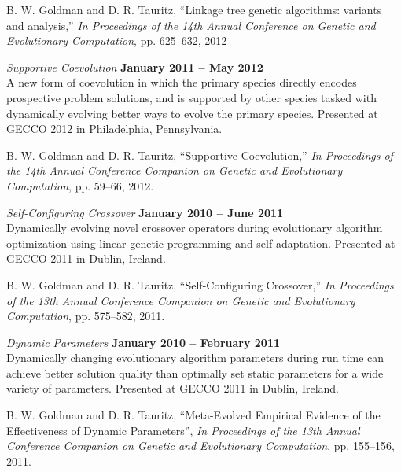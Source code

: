 \documentclass[margin,line]{resume}
\begin{document}
\begin{resume}
    \vspace{-2mm}
    B. W. Goldman and D. R. Tauritz,
    ``Linkage tree genetic algorithms: variants and analysis,''
    \textsl{In Proceedings of the 14th Annual Conference on Genetic and Evolutionary Computation}, pp. 625--632, 2012

    \textsl{Supportive Coevolution} \hfill \textbf{January 2011 -- May 2012}\\
    A new form of coevolution in which the primary species directly encodes prospective problem solutions,
    and is supported by other species tasked with dynamically evolving better ways to evolve the primary species.
    Presented at GECCO 2012 in Philadelphia, Pennsylvania.
    
    \vspace{-2mm}
    B. W. Goldman and D. R. Tauritz,
    ``Supportive Coevolution,''
    \textsl{In Proceedings of the 14th Annual Conference Companion on Genetic and Evolutionary Computation}, pp. 59--66, 2012.

    \pagebreak
    
    \textsl{Self-Configuring Crossover} \hfill \textbf{January 2010 -- June 2011}\\
    Dynamically evolving novel crossover operators during evolutionary algorithm optimization 
    using linear genetic programming and self-adaptation.  Presented at GECCO 2011 in Dublin, Ireland.
    
    \vspace{-2mm}
    B. W. Goldman and D. R. Tauritz,
    ``Self-Configuring Crossover,''
    \textsl{In Proceedings of the 13th Annual Conference Companion on Genetic and Evolutionary Computation}, pp. 575--582, 2011.

    \textsl{Dynamic Parameters} \hfill \textbf{January 2010 -- February 2011}\\
    Dynamically changing evolutionary algorithm parameters during run time can achieve better solution quality
    than optimally set static parameters for a wide variety of parameters.
    Presented at GECCO 2011 in Dublin, Ireland.

    \vspace{-2mm}    
    B. W. Goldman and D. R. Tauritz,
    ``Meta-Evolved Empirical Evidence of the Effectiveness of Dynamic Parameters'',
    \textsl{In Proceedings of the 13th Annual Conference Companion on Genetic and Evolutionary Computation}, pp. 155--156, 2011.
    

\end{resume}
\end{document}
